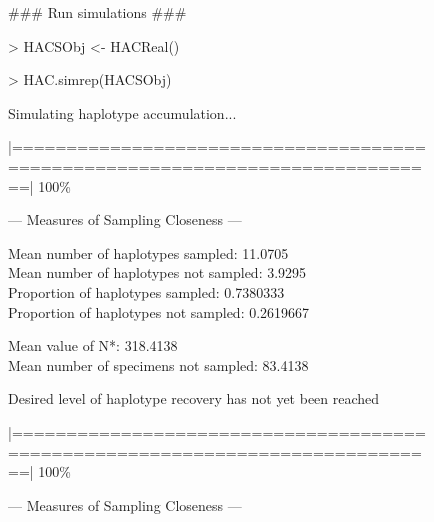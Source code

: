\begin{figure}[H]

{\scriptsize \tt

{\noindent \#\#\# Run simulations \#\#\#}

\vspace{1mm}

{\noindent > HACSObj <- HACReal()}

\vspace{1mm}

{\noindent > HAC.simrep(HACSObj)} 

\vspace{1mm}

\noindent Simulating haplotype accumulation...

\vspace{2mm}
 
\noindent |==============================================================================| 100\%
  
\vspace{3mm}
 
\noindent --- Measures of Sampling Closeness ---

\vspace{2mm} 
 
\noindent Mean number of haplotypes sampled: 11.0705  \\
Mean number of haplotypes not sampled: 3.9295 \\
Proportion of haplotypes sampled: 0.7380333 \\
Proportion of haplotypes not sampled: 0.2619667   

\vspace{2mm} 
 
\noindent Mean value of N*: 318.4138 \\
Mean number of specimens not sampled: 83.4138

\vspace{3mm}
 
\noindent Desired level of haplotype recovery has not yet been reached 

\vspace{2mm}

\noindent |==============================================================================| 100\%

\vspace{3mm}

\noindent --- Measures of Sampling Closeness ---

\vspace{2mm} 
 
}
\end{figure}
